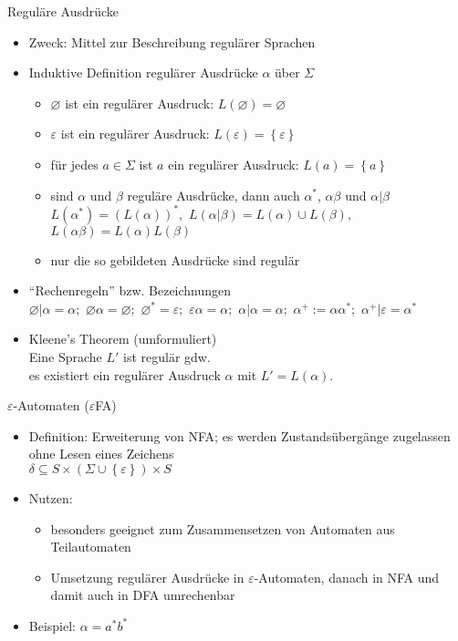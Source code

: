 \begin{frame}{Reguläre Ausdrücke}
	\begin{itemize}
		\item Zweck: Mittel zur Beschreibung regulärer Sprachen
		\item Induktive Definition regulärer Ausdrücke $\alpha$ über $\Sigma$
		\begin{itemize}
			\item $\varnothing $ ist ein regulärer Ausdruck: $L(\varnothing)=\varnothing$
			\item $\varepsilon$ ist ein regulärer Ausdruck: $L(\varepsilon)=\left\{\varepsilon\right\}$
			\item für jedes $a \in \Sigma$ ist $a$ ein regulärer Ausdruck: $L(a)=\left\{a\right\}$
			\item sind $\alpha$ und $\beta$ reguläre Ausdrücke, dann auch $\alpha^*$, $\alpha\beta$ und $\alpha | \beta$\\
			\quad $L(\alpha^*)=(L(\alpha))^*,$ $L(\alpha|\beta)=L(\alpha)\cup L(\beta),$ $L(\alpha\beta)=L(\alpha)L(\beta)$
			\item nur die so gebildeten Ausdrücke sind regulär
		\end{itemize}
		\item "`Rechenregeln"' bzw. Bezeichnungen\\
		\quad $\varnothing|\alpha=\alpha;$ $\varnothing\alpha=\varnothing;$ $\varnothing^*=\varepsilon;$ $\varepsilon\alpha=\alpha;$ $\alpha|\alpha=\alpha;$ $\alpha^+:=\alpha\alpha^*;$ $\alpha^+|\varepsilon=\alpha^*$
		\item Kleene's Theorem (umformuliert)\\
		\quad Eine Sprache $L'$ ist regulär gdw.\\
		\quad es existiert ein regulärer Ausdruck $\alpha$ mit $L'=L(\alpha)$.
	\end{itemize}
\end{frame}

\begin{frame}{$\varepsilon$-Automaten ($\varepsilon$FA)}
	\begin{itemize}
		\item Definition: Erweiterung von NFA; es werden Zustandsübergänge zugelassen ohne Lesen eines Zeichens\\
		\quad $\delta\subseteq S \times \left(\Sigma \cup \left\{\varepsilon\right\}\right) \times S$
		\item Nutzen:
		\begin{itemize}
			\item besonders geeignet zum Zusammensetzen von Automaten aus Teilautomaten
			\item Umsetzung regulärer Ausdrücke in $\varepsilon$-Automaten, danach in NFA und damit auch in DFA umrechenbar
		\end{itemize}
		\item Beispiel: $\alpha=a^*b^*$
	\end{itemize}
\end{frame}

